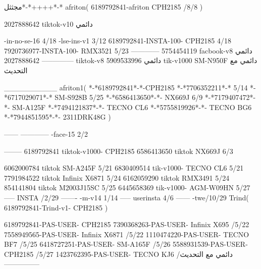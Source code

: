 مجثثل*-*++++*-*
afriton(
6189792841-afriton CPH2185  /8/8
)

2027888642 tiktok-v10
دائمي

-in-no-se-16 4/18
-lse-ins-v1 3/12
6189792841-INSTA-100- CPH2185 4/18
7920736977-INSTA-100- RMX3521 5/23
------------
5754454119 facbook-v8
دائمي
--------------
2027888642 tiktok-v8
دائمي
5909533996 tik-v1000  SM-N950F
دائمي مع التحديث

__________
afriton1(
*-*6189792841*-*-CPH2185
*-*7706352211*-* 5/14
*-*6717029071*-*  SM-S928B 5/25
*-*6586413650*-*- NX669J  6/9
*-*7179407472*-*-  SM-A125F \5
*-*7494121837*-*-  TECNO CL6  \5
*-*5755819926*-*-   TECNO BG6  \5
*-*7944851595*-*-   2311DRK48G  \5\2
)


------
------------
-face-15 2/2

--------
6189792841 tiktok-v1000- CPH2185 
6586413650 tiktok NX669J  6/3

6062000784 tiktok SM-A245F   5/21
6830409514 tik-v1000- TECNO CL6  5/21
7791984522 tiktok Infinix X6871   5/24
6162059290 tiktok RMX3491   5/24
854141804 tiktok M2003J15SC   5/25
6445658369 tik-v1000- AGM-W09HN  5/27
-----
 INSTA /2/29
-------
-m-v14 1/14
-----
userinsta 4/6
------
-twe/10/29
Trind(
6189792841-Trind-v1- CPH2185 
)

6189792841-PAS-USER- CPH2185 
7390368263-PAS-USER-  Infinix X695  /5/22
7558949565-PAS-USER-  Infinix X6871  /5/22
1110474220-PAS-USER-  TECNO BF7  /5/25
6418727251-PAS-USER-  SM-A165F  /5/26
5588931539-PAS-USER-  CPH2185  /5/27
1423762395-PAS-USER- TECNO KJ6  /دائمي مع التحديث
    ---------------

